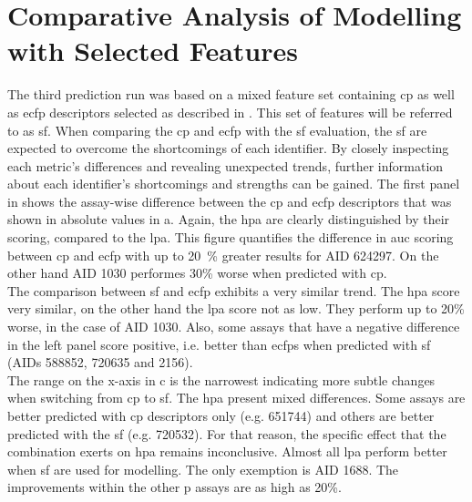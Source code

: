 \section{Comparative Analysis of Modelling with Selected Features}\label{sec:companalySF}
The third prediction run was based on a mixed feature set containing \ac{cp} as well as \ac{ecfp} descriptors selected as described in . This set of features will be referred to as \acl{sf}. When comparing the \ac{cp} and \ac{ecfp} with the \acl{sf} evaluation, the \acl{sf} are expected to overcome the shortcomings of each identifier. By closely inspecting each metric's differences and revealing unexpected trends, further information about each identifier's shortcomings and strengths can be gained.
The first panel in  shows the assay-wise difference between the \ac{cp} and \ac{ecfp} descriptors that was shown in absolute values in a. Again, the \acl{hpa} are clearly distinguished by their scoring, compared to the \acl{lpa}. This figure quantifies the difference in \ac{auc} scoring between \ac{cp} and \ac{ecfp} with up to \SI{20}{\percent} greater results for AID 624297. On the other hand AID 1030 performes 30\% worse when predicted with \ac{cp}.\\
The comparison between \acl{sf} and \ac{ecfp} exhibits a very similar trend. The \acl{hpa} score very similar, on the other hand the \acl{lpa} score not as low. They perform up to 20\% worse, in the case of AID 1030. Also, some assays that have a negative difference in the left panel score positive, i.e. better than \acp{ecfp} when predicted with \acl{sf} (AIDs 588852, 720635 and 2156).\\
The range on the x-axis in c is the narrowest indicating more subtle changes when switching from \ac{cp} to \acl{sf}. The \acl{hpa} present mixed differences. Some assays are better predicted with \ac{cp} descriptors only (e.g. 651744) and others are better predicted with the \acl{sf} (e.g. 720532). For that reason, the specific effect that the combination exerts on \acl{hpa} remains inconclusive. Almost all \acl{lpa} perform better when \acl{sf} are used for modelling. The only exemption is AID 1688. The improvements within the other \acl{p} assays are as high as 20\%.\\
\vspace{-0.35cm}
